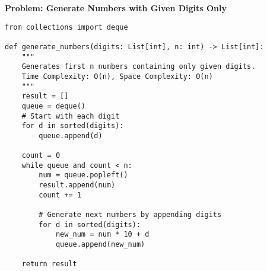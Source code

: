 \noindent\textbf{Problem: Generate Numbers with Given Digits Only}
\begin{verbatim}
from collections import deque

def generate_numbers(digits: List[int], n: int) -> List[int]:
    """
    Generates first n numbers containing only given digits.
    Time Complexity: O(n), Space Complexity: O(n)
    """
    result = []
    queue = deque()
    # Start with each digit
    for d in sorted(digits):
        queue.append(d)
    
    count = 0
    while queue and count < n:
        num = queue.popleft()
        result.append(num)
        count += 1
        
        # Generate next numbers by appending digits
        for d in sorted(digits):
            new_num = num * 10 + d
            queue.append(new_num)
    
    return result
\end{verbatim}

